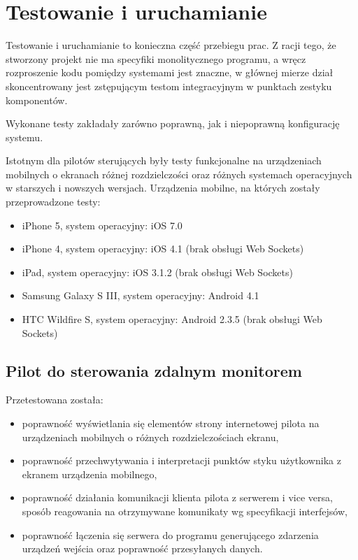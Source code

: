 \newpage
\section{Testowanie i uruchamianie}

Testowanie i uruchamianie to konieczna część przebiegu prac. Z racji tego, że stworzony projekt nie ma specyfiki monolitycznego programu, a wręcz rozproszenie kodu pomiędzy systemami jest znaczne, w głównej mierze dział skoncentrowany jest zstępującym testom integracyjnym w punktach zestyku komponentów.

Wykonane testy zakładały zarówno poprawną, jak i niepoprawną konfigurację systemu.

Istotnym dla pilotów sterujących były testy funkcjonalne na urządzeniach mobilnych o ekranach różnej rozdzielczości oraz różnych systemach operacyjnych w starszych i nowszych wersjach. Urządzenia mobilne, na których zostały przeprowadzone testy:
\begin{itemize}
	\item iPhone 5, system operacyjny: iOS 7.0
	\item iPhone 4, system operacyjny: iOS 4.1 (brak obsługi Web Sockets)
	\item iPad, system operacyjny: iOS 3.1.2 (brak obsługi Web Sockets)
	\item Samsung Galaxy S III, system operacyjny: Android 4.1
	\item HTC Wildfire S, system operacyjny: Android 2.3.5 (brak obsługi Web Sockets)
\end{itemize}

\subsection{Pilot do sterowania zdalnym monitorem}

Przetestowana została:

\begin{itemize}
	\item poprawność wyświetlania się elementów strony internetowej pilota na urządzeniach mobilnych o różnych rozdzielczościach ekranu,
	\item poprawność przechwytywania i interpretacji punktów styku użytkownika z ekranem urządzenia mobilnego,
	\item poprawność działania komunikacji klienta pilota z serwerem i vice versa, sposób reagowania na otrzymywane komunikaty wg specyfikacji interfejsów,
	\item poprawność łączenia się serwera do programu generującego zdarzenia urządzeń wejścia oraz poprawność przesyłanych danych.
\end{itemize}

